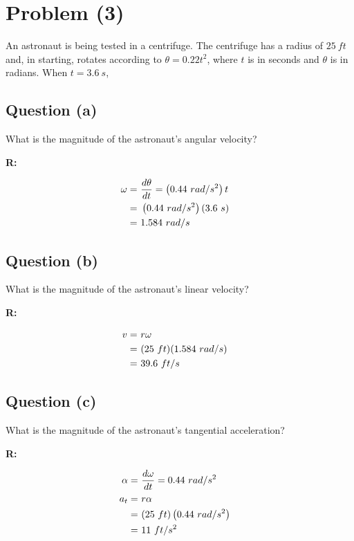 \section{Problem (3)}

	An astronaut is being tested in a centrifuge. The centrifuge has a radius of $25 \ ft$ and, in starting, rotates according to $\theta = 0.22t^{2}$, where $t$ is in seconds and $\theta$ is in radians. When $t = 3.6 \ s$,

	\subsection{Question (a)}

		What is the magnitude of the astronaut's angular velocity?

		\textbf{R:}

		\begin{align}
			\omega = \ &\frac{d \theta}{dt} = \left(0.44 \ rad/s^{2}\right)t& \notag \\
			= \ &\left(0.44 \ rad/s^{2}\right)(3.6 \ s)& \notag \\
			= \ &1.584 \ rad/s&
		\end{align}

	\subsection{Question (b)}

		What is the magnitude of the astronaut's linear velocity?

		\textbf{R:}

		\begin{align}
			v = \ &r \omega& \notag \\
			= \ &(25 \ ft)(1.584 \ rad/s)& \notag \\
			= \ &39.6 \ ft/s&
		\end{align}

	\subsection{Question (c)}

		What is the magnitude of the astronaut's tangential acceleration?

		\textbf{R:}

		\begin{align}
			\alpha = \ &\frac{d\omega}{dt} = 0.44 \ rad/s^{2}& \notag \\
			a_{t} = \ &r \alpha& \notag \\
			= \ &(25 \ ft)\left(0.44 \ rad/s^{2}\right)& \notag \\
			= \ &11 \ ft/s^{2}&
		\end{align}

